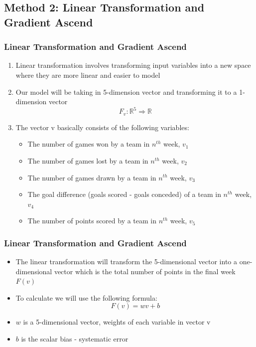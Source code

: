 \documentclass{beamer}
\begin{document}
\subsection{Method 2: Linear Transformation and Gradient Ascend}
\begin{frame}
  \frametitle{Linear Transformation and Gradient Ascend}
  \begin{enumerate}
    \item Linear transformation involves transforming input variables into a new space where they are more linear and easier to model
    \item Our model will be taking in 5-dimension vector and transforming it to a 1-dimension vector $$ F_v: \mathbb{R}^{5} \Rightarrow \mathbb{R} $$
    \item The vector v basically consists of the following variables:
          \begin{itemize}
            \item The number of games won by a team in $n^{th}$ week, $v_1$
            \item The number of games lost by a team in $n^{th}$ week, $v_2$
            \item The number of games drawn by a team in $n^{th}$ week, $v_3$
            \item The goal difference (goals scored - goals conceded) of a team in $n^{th}$ week, $v_4$
            \item The number of points scored by a team in $n^{th}$ week, $v_5$
          \end{itemize}
  \end{enumerate}
\end{frame}
% 
% 
% 
% 
% 
% 
% 
% 
\begin{frame}
  \frametitle{Linear Transformation and Gradient Ascend}
  \begin{itemize}
    \item The linear transformation will transform the 5-dimensional vector into a one-dimensional vector which is the total number of points in the final week $F(v)$
    \item To calculate we will use the following formula: $$ F(v)=wv+b $$
    \item $w$ is a 5-dimensional vector, weights of each variable in vector v
    \item $b$ is the scalar bias - systematic error

  \end{itemize}
\end{frame}
% 
\end{document}
